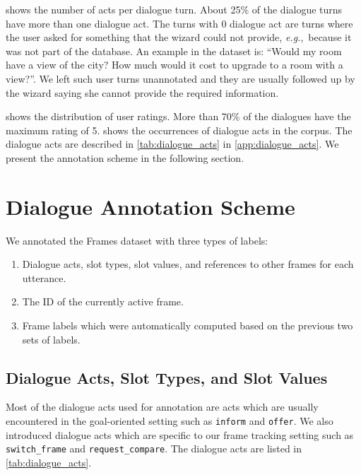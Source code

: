 \documentclass{article}
\theoremstyle{definition}
\begin{document}
 shows the number of acts per dialogue turn. About 25\% of the dialogue turns have more than one dialogue act. The turns with 0 dialogue act are turns where the user asked for something that the wizard could not provide, \textit{e.g.},~because it was not part of the database. An example in the dataset is: ``Would my room have a view of the city? How much would it cost to upgrade to a room with a view?''. We left such user turns unannotated and they are usually followed up by the wizard saying she cannot provide the required information.

 shows the distribution of user ratings. More than 70\% of the dialogues have the maximum rating of 5.  shows the occurrences of dialogue acts in the corpus. The dialogue acts are described in \cref{tab:dialogue_acts} in \cref{app:dialogue_acts}.  We present the annotation scheme in the following section.

\section{Dialogue Annotation Scheme}
\label{annotation}
We annotated the Frames dataset with three types of labels:
\begin{enumerate}
\item Dialogue acts, slot types, slot values, and references to other frames for each utterance.
\item The ID of the currently active frame.
\item Frame labels which were automatically computed based on the previous two sets of labels.
\end{enumerate}

\subsection{Dialogue Acts, Slot Types, and Slot Values}
\label{sec:dialogue-acts-slot}
Most of the dialogue acts used for annotation are acts which are usually encountered in the goal-oriented setting such as \texttt{inform} and \texttt{offer}.
We also introduced dialogue acts which are specific to our frame tracking setting such as \texttt{switch\_frame} and \texttt{request\_compare}. The dialogue acts are listed in \cref{tab:dialogue_acts}.
\end{document}
